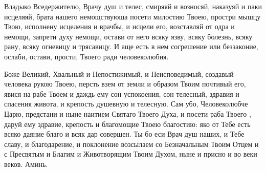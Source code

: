\mychapterending


\begin{mymulticols}
 


Владыко Вседержителю, Врачу душ и телес, смиряяй и возносяй, наказуяй и паки исцеляяй, брата нашего  немощствующа посети милостию Твоею, простри мышцу Твою, исполнену исцеления и врачбы, и исцели его, возставляй от одра и немощи, запрети духу немощи, остави от него всяку язву, всяку болезнь, всяку рану, всяку огневицу и трясавицу. И аще есть в нем согрешение или беззаконие, ослаби, остави, прости, Твоего ради человеколюбия.




\end{mymulticols}

\mychapterending


\begin{mymulticols}
 


Боже Великий, Хвальный и Непостижимый, и Неисповедимый, создавый человека рукою Твоею, персть взем от земли и образом Твоим почтивый его, явися на рабе Твоем   и даждь ему сон успокоения, сон телесный, здравия и спасения живота, и крепость душевную и телесную. Сам убо, Человеколюбче Царю, предстани и ныне наитием Святаго Твоего Духа, и посети раба Твоего , даруй ему здравие, крепость и благомощие Твоею благостию: яко от Тебе есть всяко даяние благо и всяк дар совершен. Ты бо еси Врач душ наших, и Тебе славу, и благодарение, и поклонение возсылаем со Безначальным Твоим Отцем и с Пресвятым и Благим и Животворящим Твоим Духом, ныне и присно и во веки веков. Аминь. 






\end{mymulticols}

\mychapterending


